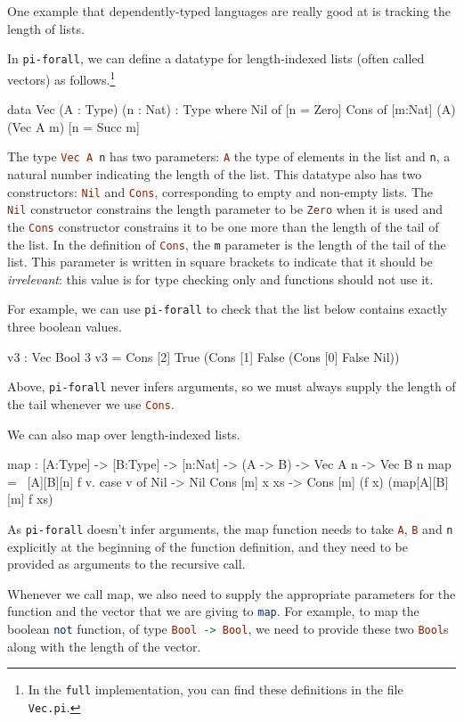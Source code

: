 \documentclass{article}
\newcommand\cd[1]{\lstinline[language=Haskell]{#1}}
\newcommand\pif{\texttt{pi-forall}\xspace}
\theoremstyle{definition}
\begin{document}
One example that dependently-typed languages are really good at is tracking
the length of lists.

In \pif, we can define a datatype for length-indexed lists (often called
vectors) as follows.\footnote{In the \texttt{full} implementation, you can find these
definitions in the file \texttt{Vec.pi}.}
\begin{piforall}
data Vec (A : Type) (n : Nat) : Type where
  Nil of  [n = Zero]
  Cons of [m:Nat] (A) (Vec A m) [n = Succ m]
\end{piforall}
The type \cd{Vec A n} has two parameters: \cd{A} the type of elements in the
list and \cd{n}, a natural number indicating the length of the list. This
datatype also has two constructors: \cd{Nil} and \cd{Cons}, corresponding to
empty and non-empty lists. The \cd{Nil} constructor constrains the length
parameter to be \cd{Zero} when it is used and the \cd{Cons} constructor
constrains it to be one more than the length of the tail of the list.  In the
definition of \cd{Cons}, the \cd{m} parameter is the length of the tail of the
list. This parameter is written in square brackets to indicate that it should
be \emph{irrelevant}: this value is for type checking only and functions
should not use it.

For example, we can use \pif to check that the list below contains exactly
three boolean values.
\begin{piforall}
v3 : Vec Bool 3
v3 = Cons [2] True (Cons [1] False (Cons [0] False Nil))
\end{piforall}
Above, \pif never infers arguments, so we must always supply the length of the
tail whenever we use \cd{Cons}.

We can also map over length-indexed lists.
\begin{piforall}
map : [A:Type] -> [B:Type] -> [n:Nat] -> (A -> B) -> Vec A n -> Vec B n
map = \ [A][B][n] f v.
  case v of
    Nil -> Nil
    Cons [m] x xs -> Cons [m] (f x) (map[A][B][m] f xs)
\end{piforall}
As \pif doesn't infer arguments, the map function needs to take \cd{A}, \cd{B}
and \cd{n} explicitly at the beginning of the function definition, and they
need to be provided as arguments to the recursive call.

Whenever we call map, we also need to supply the appropriate parameters for
the function and the vector that we are giving to \cd{map}. For example, to map
the boolean \cd{not} function, of type \cd{Bool -> Bool}, we need to provide
these two \cd{Bool}s along with the length of the vector.
\end{document}
